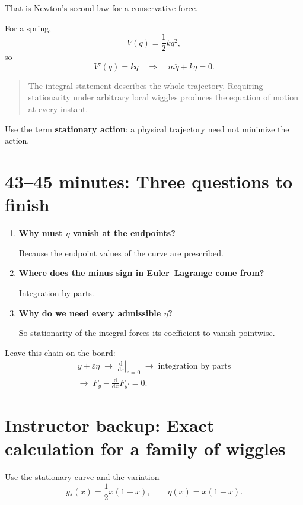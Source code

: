 \documentclass[11pt,a4paper]{article}
\newcommand{\dd}{\mathrm{d}}
\begin{document}
That is Newton's second law for a conservative force.

For a spring,
\[
V(q)=\frac12kq^2,
\]
so
\[
V'(q)=kq
\quad\Longrightarrow\quad
\boxed{m\ddot q+kq=0.}
\]

\begin{quote}
The integral statement describes the whole trajectory.
Requiring stationarity under arbitrary local wiggles produces
the equation of motion at every instant.
\end{quote}

Use the term \textbf{stationary action}:
a physical trajectory need not minimize the action.

\section*{43--45 minutes: Three questions to finish}

\begin{enumerate}
\item \textbf{Why must \(\eta\) vanish at the endpoints?}

Because the endpoint values of the curve are prescribed.

\item \textbf{Where does the minus sign in Euler--Lagrange come from?}

Integration by parts.

\item \textbf{Why do we need every admissible \(\eta\)?}

So stationarity of the integral forces its coefficient
to vanish pointwise.
\end{enumerate}

Leave this chain on the board:
\[
\boxed{
\begin{gathered}
y+\varepsilon\eta
\;\longrightarrow\;
\left.\frac{\dd}{\dd\varepsilon}\right|_{\varepsilon=0}
\;\longrightarrow\;
\text{integration by parts}\\[4pt]
\longrightarrow\;
F_y-\frac{\dd}{\dd x}F_{y'}=0.
\end{gathered}
}
\]

\clearpage

\section*{Instructor backup: Exact calculation for a family of wiggles}

Use the stationary curve and the variation
\[
y_*(x)=\frac12x(1-x),
\qquad
\eta(x)=x(1-x).
\]
\end{document}
